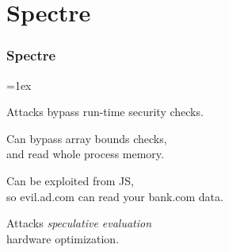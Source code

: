 \documentclass[aspectratio=169]{beamer}
\begin{document}
\section{Spectre}
\begin{frame}
  \frametitle{Spectre}

  {\fboxrule=1ex\fboxsep=0pt}\quad
  \begin{minipage}[b]{.6\textwidth}\raggedright
    Attacks bypass run-time security checks.
    
    \bigskip
    Can bypass array bounds checks,\\
    and read whole process memory.

    \bigskip
    Can be exploited from JS,\\
    so evil.ad.com can read your bank.com data.

    \bigskip
    Attacks \emph{speculative evaluation}\\
    hardware optimization.
    
  \end{minipage}
\end{frame}
\end{document}
